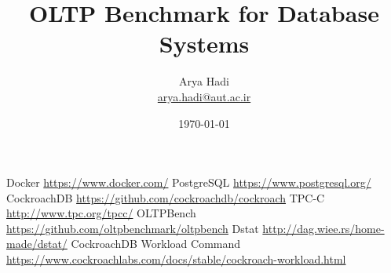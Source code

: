 \documentclass[letterpaper,12pt]{article}
\begin{document}
\title{OLTP Benchmark for Database Systems}
\author{Arya Hadi \\ \href{mailto:arya.hadi@aut.ac.ir}{arya.hadi@aut.ac.ir}}
\date{\today}
\maketitle

% 
% 



\begin{thebibliography}{9}
    Docker \href{https://www.docker.com/}{https://www.docker.com/}
    PostgreSQL \href{https://www.postgresql.org/}{https://www.postgresql.org/}
    CockroachDB \href{https://github.com/cockroachdb/cockroach}{https://github.com/cockroachdb/cockroach}
    TPC-C \href{http://www.tpc.org/tpcc/}{http://www.tpc.org/tpcc/}
    OLTPBench \href{https://github.com/oltpbenchmark/oltpbench}{https://github.com/oltpbenchmark/oltpbench}
    Dstat \href{http://dag.wiee.rs/home-made/dstat/}{http://dag.wiee.rs/home-made/dstat/}
    CockroachDB Workload Command \href{https://www.cockroachlabs.com/docs/stable/cockroach-workload.html}{https://www.cockroachlabs.com/docs/stable/cockroach-workload.html}
\end{thebibliography}
\end{document}
